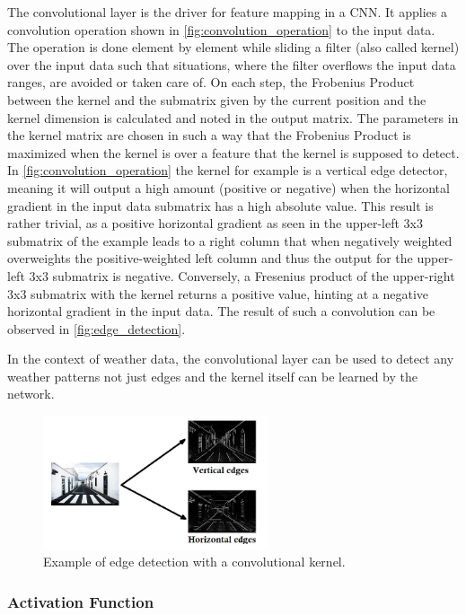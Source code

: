 The convolutional layer is the driver for feature mapping in a CNN. It applies a convolution operation shown in \autoref{fig:convolution_operation} to the input data. The operation is done element by element while sliding a filter (also called kernel) over the input data such that situations, where the filter overflows the input data ranges, are avoided or taken care of. On each step, the Frobenius Product between the kernel and the submatrix given by the current position and the kernel dimension is calculated and noted in the output matrix. The parameters in the kernel matrix are chosen in such a way that the Frobenius Product is maximized when the kernel is over a feature that the kernel is supposed to detect. In \autoref{fig:convolution_operation} the kernel for example is a vertical edge detector, meaning it will output a high amount (positive or negative) when the horizontal gradient in the input data submatrix has a high absolute value. This result is rather trivial, as a positive horizontal gradient as seen in the upper-left 3x3 submatrix of the example leads to a right column that when negatively weighted overweights the positive-weighted left column and thus the output for the upper-left 3x3 submatrix is negative. Conversely, a Fresenius product of the upper-right 3x3 submatrix with the kernel returns a positive value, hinting at a negative horizontal gradient in the input data. The result of such a convolution can be observed in \autoref{fig:edge_detection}.

In the context of weather data, the convolutional layer can be used to detect any weather patterns not just edges and the kernel itself can be learned by the network.

\begin{figure}
    \centering
    \includegraphics[width=250px]{resources/images/edge_detection.jpeg}
    \caption{Example of edge detection with a convolutional kernel. \cite{datahacker}}
    \label{fig:edge_detection}
\end{figure}

\subsubsection*{Activation Function}

